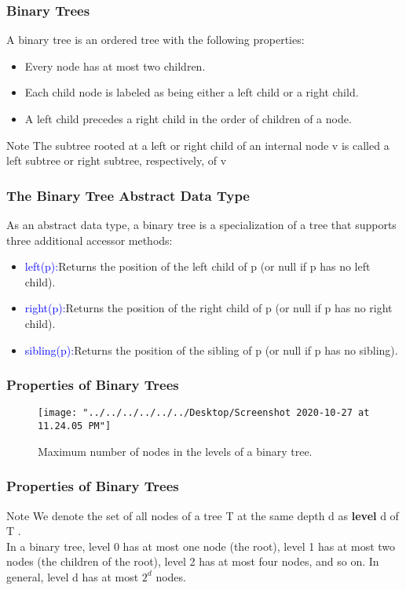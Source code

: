 \documentclass[11pt]{beamer}
\begin{document}
   	\begin{frame}
   	\frametitle{Binary Trees}
   A binary tree is an ordered tree with the following properties:
   	\begin{itemize}
   		\item  Every node has at most two children.
   		\item Each child node is labeled as being either a left child or a right child.
   		\item A left child precedes a right child in the order of children of a node.\\
   	\end{itemize}
   \begin{alertblock}{Note}
   	The subtree rooted at a left or right child of an internal node v is called a left subtree or right subtree, respectively, of v
   \end{alertblock}
   \end{frame}

    \begin{frame}
  	\frametitle{The Binary Tree Abstract Data Type}
  	As an abstract data type, a binary tree is a specialization of a tree that supports three additional accessor methods:
  	\begin{itemize}
  		\item \textcolor{blue}{left(p):}Returns the position of the left child of p (or null if p has no left child).
  		\item \textcolor{blue}{right(p):}Returns the position of the right child of p (or null if p has no right child).
  		\item \textcolor{blue}{sibling(p):}Returns the position of the sibling of p
  		(or null if p has no sibling).
  	\end{itemize}
  \end{frame}

	 \begin{frame}
	 	\frametitle{Properties of Binary Trees}
 	    \begin{figure}
 	    	\centering
 	    	\texttt{[image: "../../../../../../Desktop/Screenshot 2020-10-27 at 11.24.05 PM"]}
 	    	\caption{Maximum number of nodes in the levels of a binary tree.}
 	    	\label{fig:screenshot-2020-10-27-at-11}
 	    \end{figure}   
	 \end{frame}
     
     \begin{frame}
     	\frametitle{Properties of Binary Trees}
     	\begin{alertblock}{Note}
     		We denote the set of all nodes of a tree T at the same depth d as \textbf{level} d of T . \\
     		In a binary tree, level 0 has at most one node (the root), level 1 has at most two nodes (the children of the root), level 2 has at most four nodes, and so on.  In general, level d has at most $2^{d} $ nodes.
     	\end{alertblock}   	
     \end{frame}
 
\end{document}
